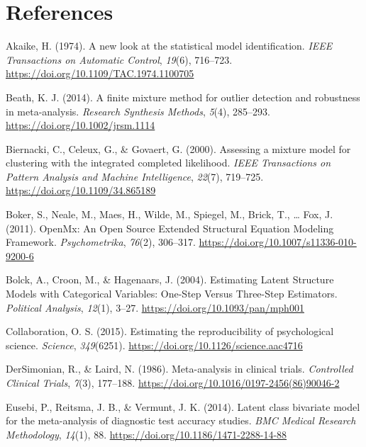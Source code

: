 \documentclass[
  english,
  man, noextraspace,floatsintext]{apa6}
\newlength{\cslhangindent}
\newenvironment{CSLReferences}[2] %
 {\begin{list}{}{%
  \setlength{\itemindent}{0pt}
  \setlength{\leftmargin}{0pt}
  \setlength{\parsep}{0pt}
  \ifodd #1
   \setlength{\leftmargin}{\cslhangindent}
   \setlength{\itemindent}{-1\cslhangindent}
  \fi
  \setlength{\itemsep}{#2\baselineskip}}}
 {\end{list}}
\begin{document}
\section{References}\label{references}

\protect{}\label{refs}
\begin{CSLReferences}{1}{0}
Akaike, H. (1974). A new look at the statistical model identification. \emph{IEEE Transactions on Automatic Control}, \emph{19}(6), 716--723. \url{https://doi.org/10.1109/TAC.1974.1100705}

Beath, K. J. (2014). A finite mixture method for outlier detection and robustness in meta-analysis. \emph{Research Synthesis Methods}, \emph{5}(4), 285--293. \url{https://doi.org/10.1002/jrsm.1114}

Biernacki, C., Celeux, G., \& Govaert, G. (2000). Assessing a mixture model for clustering with the integrated completed likelihood. \emph{IEEE Transactions on Pattern Analysis and Machine Intelligence}, \emph{22}(7), 719--725. \url{https://doi.org/10.1109/34.865189}

Boker, S., Neale, M., Maes, H., Wilde, M., Spiegel, M., Brick, T., \ldots{} Fox, J. (2011). {OpenMx}: {An Open Source Extended Structural Equation Modeling Framework}. \emph{Psychometrika}, \emph{76}(2), 306--317. \url{https://doi.org/10.1007/s11336-010-9200-6}

Bolck, A., Croon, M., \& Hagenaars, J. (2004). Estimating {Latent Structure Models} with {Categorical Variables}: {One-Step Versus Three-Step Estimators}. \emph{Political Analysis}, \emph{12}(1), 3--27. \url{https://doi.org/10.1093/pan/mph001}

Collaboration, O. S. (2015). Estimating the reproducibility of psychological science. \emph{Science}, \emph{349}(6251). \url{https://doi.org/10.1126/science.aac4716}

DerSimonian, R., \& Laird, N. (1986). Meta-analysis in clinical trials. \emph{Controlled Clinical Trials}, \emph{7}(3), 177--188. \url{https://doi.org/10.1016/0197-2456(86)90046-2}

Eusebi, P., Reitsma, J. B., \& Vermunt, J. K. (2014). Latent class bivariate model for the meta-analysis of diagnostic test accuracy studies. \emph{BMC Medical Research Methodology}, \emph{14}(1), 88. \url{https://doi.org/10.1186/1471-2288-14-88}


\end{CSLReferences}
\end{document}

